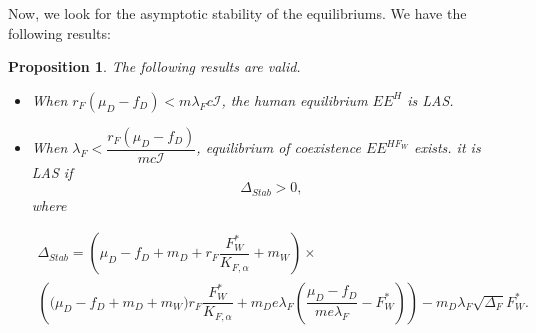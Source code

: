 \documentclass{article}
\newcommand{\lfw}{\lambda_{F}}
\newcommand{\lfw}{\lambda_{F}}
\newtheorem{prop}{Proposition}
\begin{document}
Now, we look for the asymptotic stability of the equilibriums. We have the following results:

\begin{prop}\label{propLAS} The following results are valid.
\begin{itemize}
\item When $r_F(\mu_D - f_D) < m \lfw c\mathcal{I}$, the human equilibrium $EE^{H}$ is LAS.
\item When $\lfw < \dfrac{r_F (\mu_D -f_D)}{m c\mathcal{I}}$, equilibrium of coexistence $EE^{HF_W}$  exists. it is LAS if 
$$\Delta_{Stab} > 0,$$  where 

\begin{multline*}
\Delta_{Stab} = \left(\mu_D -f_D + m_D + r_F \dfrac{F_W^*}{K_{F, \alpha}} + m_W\right) \times \\
\left(\big( \mu_D -f_D + m_D + m_W) r_F \dfrac{F^*_W}{K_{F, \alpha}}   + m_D e\lfw   \left(\dfrac{\mu_D - f_D}{m e\lfw} - F^*_W \right)\right) - m_D \lfw \sqrt{\Delta_F}  F^*_{W}.
\end{multline*}
\end{itemize}
\end{prop}
\end{document}
